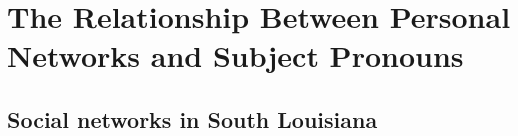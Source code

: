 \chapter{The Relationship Between Personal Networks and Subject Pronouns}
  \section{Social networks in South Louisiana}
